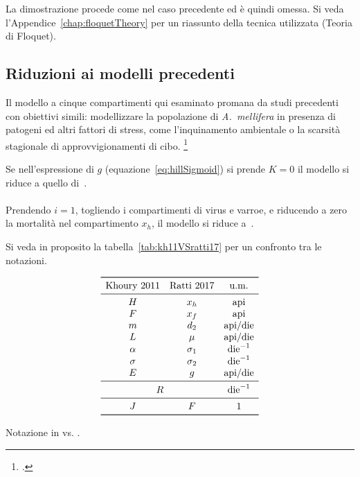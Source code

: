 La dimostrazione procede come nel caso precedente ed è quindi omessa.
Si veda l'Appendice~\ref{chap:floquetTheory}
per un riassunto della tecnica utilizzata (Teoria di Floquet).


\subsection{Riduzioni ai modelli precedenti}
Il modello a cinque compartimenti qui esaminato promana da studi precedenti con obiettivi simili:
modellizzare la popolazione di \emph{A.~mellifera} in presenza di patogeni ed altri fattori di stress, come
l'inquinamento ambientale o la scarsità stagionale di approvvigionamenti di cibo.
\footcite{ratti2012,ratti2015,sumMar04,khoury2011,betti2016,betti2014}

Se nell'espressione di $g$ (equazione~\eqref{eq:hillSigmoid}) si prende $K=0$ il modello si riduce a
quello di~\cite{sumMar04}.

\paragraph{}
Prendendo $i=1$, togliendo i compartimenti di virus e varroe, e riducendo a zero la mortalità nel
compartimento $x_h$, il modello si riduce a~\cite{khoury2011}.

Si veda in proposito la tabella~\ref{tab:kh11VSratti17} per un confronto tra le notazioni.

\begin{table}[pbh]
    $$\begin{array}{ccc}
        \toprule
        \text{Khoury~2011}
        & \text{Ratti~2017}
        & \text{u.m.} \\
        \midrule
        H & x_h & \text{api} \\
        F & x_f & \text{api} \\
        m & d_2 & \text{api}/\text{die} \\
        L & \mu & \text{api}/\text{die} \\
        \alpha & \sigma_1 & \text{die}^{-1} \\
        \sigma & \sigma_2 & \text{die}^{-1} \\
        E & g & \text{api}/\text{die} \\
        \midrule
        \multicolumn{2}{c}{R} & \text{die}^{-1} \\
        \midrule
        J & F & 1 \\
        \bottomrule
    \end{array}$$
    \caption{Notazione in \cite{khoury2011} vs. \cite{ratti2017}.}
    \label{tab:kh11VSratti17}
\end{table}

